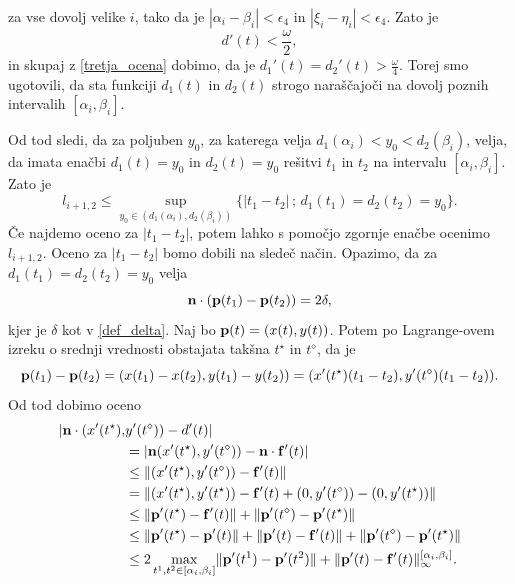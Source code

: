 za vse dovolj velike $i$, tako da je $|\alpha _i-\beta _i| < \epsilon _4$ in $|\xi _i - \eta _i| < \epsilon _4$. Zato je 
\begin{equation}\label{ocena_omega}
d'(t)<\frac{\omega}{2},
\end{equation}
 in skupaj z \ref{tretja_ocena} dobimo, da je $d_1'(t) = d_2'(t) > \frac{\omega}{4}$. Torej smo ugotovili, da sta funkciji $d_1(t)$ in $d_2(t)$ strogo naraščajoči na dovolj poznih intervalih $[\alpha _i, \beta _i]$.

Od tod sledi, da za poljuben $y_0$, za katerega velja $d_1(\alpha _i) < y_0 < d_2(\beta _i)$, velja, da imata enačbi $d_1(t)=y_0$ in $d_2(t) = y_0$ rešitvi $t_1$ in $t_2$ na intervalu $[\alpha _i, \beta _i]$. Zato je
$$
l_{i+1, 2} \leq \sup _{y_0\in (d_1(\alpha _i), d_2(\beta _i))} \{ |t_1-t_2|\, ; \, d_1(t_1)=d_2(t_2)=y_0\}.
$$
Če najdemo oceno za $|t_1-t_2|$, potem lahko s pomočjo zgornje enačbe ocenimo $l_{i+1,2}$. Oceno za $|t_1-t_2|$ bomo dobili na sledeč način. 
Opazimo, da za $d_1(t_1) = d_2(t_2) = y_0$ velja
$$
{\bf n}\cdot ({\bf p} (t_1) - {\bf p}(t_2)) = 2\delta,
$$
kjer je $\delta$ kot v \ref{def_delta}. Naj bo ${\bf p}(t)=(x(t),y(t))$. Potem po Lagrange-ovem izreku o srednji vrednosti obstajata takšna $t^{\star}$ in $t^{\diamond}$, da je
$$
{\bf p}(t_1) - {\bf p}(t_2) = (x(t_1) - x(t_2), y(t_1) - y(t_2)) = (x'(t^{\star})(t_1-t_2),y'(t^{\diamond})(t_1-t_2)).
$$
Od tod dobimo oceno
\begin{equation*}
\begin{split}
|{\bf n}\cdot(x'(t^{\star}), &y'(t^\diamond)) - d'(t)|  \\
& = |{\bf n} (x'(t^\star), y'(t^\diamond)) - {\bf n}\cdot {\bf f}'(t) | \\
& \leq \lVert (x'(t^\star), y'(t^\diamond)) - {\bf f}'(t)\rVert \\
& = \lVert (x'(t^\star),y'(t^\star)) - {\bf f}'(t) + (0, y'(t^\diamond)) - (0,y'(t^\star))\rVert \\
& \leq \lVert {\bf p}'(t^\star) - {\bf f}'(t)\rVert + \lVert {\bf p}'(t^\diamond) - {\bf p}'(t^\star)\rVert \\ 
& \leq \lVert {\bf p}'(t^\star) - {\bf p}'(t)\rVert + \lVert {\bf p}'(t) - {\bf f}'(t)\rVert + 
\lVert {\bf p}'(t^\diamond) - {\bf p}'(t^\star)\rVert \\
& \leq 2\max _{t^1,t^2\in [\alpha _i,\beta _i]} \lVert {\bf p}'(t^1) - {\bf p}'(t^2)\rVert + 
\lVert {\bf p}'(t) - {\bf f}'(t)\rVert _{\infty}^{[\alpha _i,\beta _i]}.
\end{split}
\end{equation*}
